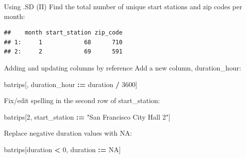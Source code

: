 \documentclass[]{book}
\newenvironment{Shaded}{\begin{snugshade}}{\end{snugshade}}
\newcommand{\DecValTok}[1]{\textcolor[rgb]{0.00,0.00,0.81}{#1}}
\newcommand{\ErrorTok}[1]{\textcolor[rgb]{0.64,0.00,0.00}{\textbf{#1}}}
\newcommand{\KeywordTok}[1]{\textcolor[rgb]{0.13,0.29,0.53}{\textbf{#1}}}
\newcommand{\NormalTok}[1]{#1}
\newcommand{\OperatorTok}[1]{\textcolor[rgb]{0.81,0.36,0.00}{\textbf{#1}}}
\newcommand{\OtherTok}[1]{\textcolor[rgb]{0.56,0.35,0.01}{#1}}
\newcommand{\StringTok}[1]{\textcolor[rgb]{0.31,0.60,0.02}{#1}}
\begin{document}
Using .SD (II)
Find the total number of unique start stations and zip codes per month:

\begin{Shaded}
\end{Shaded}

\begin{verbatim}
##    month start_station zip_code
## 1:     1            68      710
## 2:     2            69      591
\end{verbatim}

Adding and updating columns by reference
Add a new column, duration\_hour:

\begin{Shaded}
\begin{Highlighting}[]
\NormalTok{batrips[, duration_hour }\OperatorTok{:}\ErrorTok{=}\StringTok{ }\NormalTok{duration }\OperatorTok{/}\StringTok{ }\DecValTok{3600}\NormalTok{]}
\end{Highlighting}
\end{Shaded}

Fix/edit spelling in the second row of start\_station:

\begin{Shaded}
\begin{Highlighting}[]
\NormalTok{batrips[}\DecValTok{2}\NormalTok{, start_station }\OperatorTok{:}\ErrorTok{=}\StringTok{ "San Francisco City Hall 2"}\NormalTok{]}
\end{Highlighting}
\end{Shaded}

Replace negative duration values with NA:

\begin{Shaded}
\begin{Highlighting}[]
\NormalTok{batrips[duration }\OperatorTok{<}\StringTok{ }\DecValTok{0}\NormalTok{, duration }\OperatorTok{:}\ErrorTok{=}\StringTok{ }\OtherTok{NA}\NormalTok{]}
\end{Highlighting}
\end{Shaded}
\end{document}
